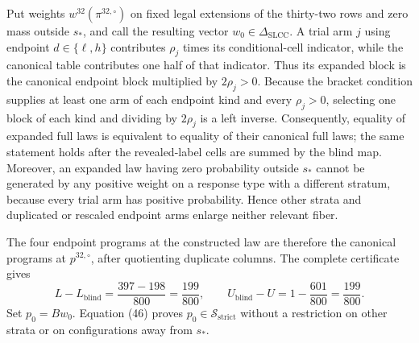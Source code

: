 Put weights \(w^{32}(\pi^{32,\circ})\) on fixed legal extensions of the thirty-two rows and zero mass outside \(s_*\), and call the resulting vector \(w_0\in\Delta_{\mathrm{SLCC}}\).  A trial arm \(j\) using endpoint \(d\in\{\ell,h\}\) contributes \(\rho_j\) times its conditional-cell indicator, while the canonical table contributes one half of that indicator.  Thus its expanded block is the canonical endpoint block multiplied by \(2\rho_j>0\).  Because the bracket condition supplies at least one arm of each endpoint kind and every \(\rho_j>0\), selecting one block of each kind and dividing by \(2\rho_j\) is a left inverse.  Consequently, equality of expanded full laws is equivalent to equality of their canonical full laws; the same statement holds after the revealed-label cells are summed by the blind map.  Moreover, an expanded law having zero probability outside \(s_*\) cannot be generated by any positive weight on a response type with a different stratum, because every trial arm has positive probability.  Hence other strata and duplicated or rescaled endpoint arms enlarge neither relevant fiber.

The four endpoint programs at the constructed law are therefore the canonical programs at \(p^{32,\circ}\), after quotienting duplicate columns.  The complete certificate gives
\[
L-L_{\mathrm{blind}}=\frac{397-198}{800}=\frac{199}{800},
\qquad
U_{\mathrm{blind}}-U=1-\frac{601}{800}=\frac{199}{800}.
\tag{46}
\]
Set \(p_0=Bw_0\).  Equation (46) proves \(p_0\in\mathcal S_{\mathrm{strict}}\) without a restriction on other strata or on configurations away from \(s_*\).

